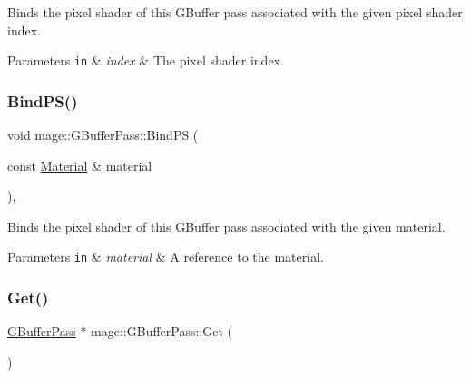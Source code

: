 Binds the pixel shader of this G\+Buffer pass associated with the given pixel shader index.


\begin{DoxyParams}[1]{Parameters}
\mbox{\tt in}  & {\em index} & The pixel shader index. \\
\hline
\end{DoxyParams}
\hypertarget{classmage_1_1_g_buffer_pass_afe16e10cc6d3c7d56d387eb1fe2a66ee}{}\label{classmage_1_1_g_buffer_pass_afe16e10cc6d3c7d56d387eb1fe2a66ee} 
\subsubsection{\texorpdfstring{Bind\+P\+S()}{BindPS()}\hspace{0.1cm}{\footnotesize\ttfamily [2/2]}}
{\footnotesize\ttfamily void mage\+::\+G\+Buffer\+Pass\+::\+Bind\+PS (\begin{DoxyParamCaption}\item[{const \hyperlink{classmage_1_1_material}{Material} \&}]{material }\end{DoxyParamCaption})\hspace{0.3cm}{\ttfamily [private]}, {\ttfamily [noexcept]}}

Binds the pixel shader of this G\+Buffer pass associated with the given material.


\begin{DoxyParams}[1]{Parameters}
\mbox{\tt in}  & {\em material} & A reference to the material. \\
\hline
\end{DoxyParams}
\hypertarget{classmage_1_1_g_buffer_pass_ab2a50a7bde900978153badaa49cf047c}{}\label{classmage_1_1_g_buffer_pass_ab2a50a7bde900978153badaa49cf047c} 
\subsubsection{\texorpdfstring{Get()}{Get()}}
{\footnotesize\ttfamily \hyperlink{classmage_1_1_g_buffer_pass}{G\+Buffer\+Pass} $\ast$ mage\+::\+G\+Buffer\+Pass\+::\+Get (\begin{DoxyParamCaption}{ }\end{DoxyParamCaption})\hspace{0.3cm}{\ttfamily [static]}}

